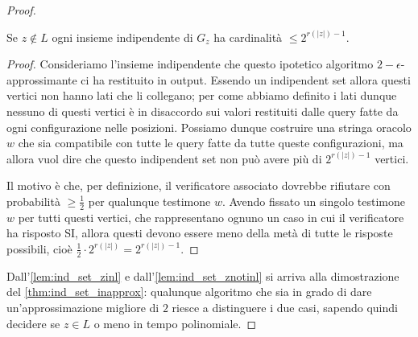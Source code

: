 \begin{proof}
\begin{oss}
	Se $z \notin L$ ogni insieme indipendente di $G_z$ ha cardinalità
	$\leq 2^{r(|z|)-1}$.
\end{oss}
\begin{proof}
	Consideriamo l'insieme indipendente che questo ipotetico algoritmo
	$2-\epsilon$-approssimante ci ha restituito in output.
	Essendo un indipendent set allora questi vertici non hanno lati che li
	collegano; per come abbiamo definito i lati dunque nessuno di questi
	vertici è in disaccordo sui valori restituiti dalle query fatte da ogni
	configurazione nelle posizioni. Possiamo dunque costruire una stringa
	oracolo $w$ che sia compatibile con tutte le query fatte da tutte queste
	configurazioni, ma allora vuol dire che questo indipendent set non può
	avere più di $2^{r(|z|) - 1}$ vertici.

	Il motivo è che, per definizione, il verificatore associato dovrebbe
	rifiutare con probabilità $\geq \frac{1}{2}$ per qualunque testimone $w$.
	Avendo fissato un singolo testimone $w$ per tutti questi vertici, che
	rappresentano ognuno un caso in cui il verificatore ha risposto SI, allora
	questi devono essere meno della metà di tutte le risposte possibili, cioè
	$\frac{1}{2}\cdot 2^{r(|z|)} = 2^{r(|z|) - 1}$.
\end{proof}

Dall'\cref{lem:ind_set_zinl} e dall'\cref{lem:ind_set_znotinl} si arriva alla
dimostrazione del \cref{thm:ind_set_inapprox}: qualunque algoritmo che sia in
grado di dare un'approssimazione migliore di $2$ riesce a distinguere i due
casi, sapendo quindi decidere se $z \in L$ o meno in tempo polinomiale.
\end{proof}

